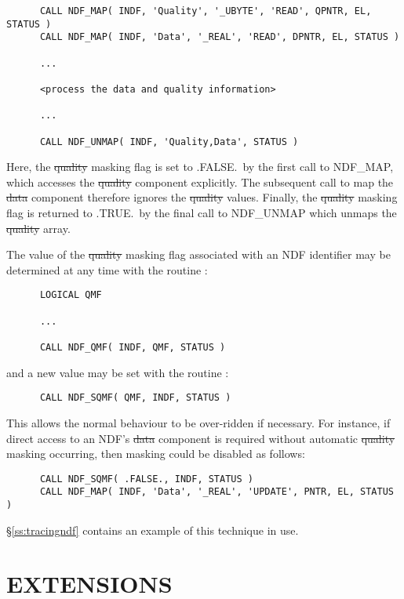 \small
\begin{verbatim}
      CALL NDF_MAP( INDF, 'Quality', '_UBYTE', 'READ', QPNTR, EL, STATUS )
      CALL NDF_MAP( INDF, 'Data', '_REAL', 'READ', DPNTR, EL, STATUS )

      ...

      <process the data and quality information>

      ...

      CALL NDF_UNMAP( INDF, 'Quality,Data', STATUS )
\end{verbatim}
\normalsize

Here, the \st{quality\/} masking flag is set to .FALSE.\ by the first call to
NDF\_MAP,  which accesses the \st{quality\/} component explicitly. 
The subsequent call to map the \st{data\/} component therefore ignores the
\st{quality\/} values.
Finally, the \st{quality\/} masking flag is returned to .TRUE.\ by the final call
to  NDF\_UNMAP which unmaps the \st{quality\/} array.

The value of the \st{quality\/} masking flag associated with an NDF identifier
may be determined at any time with the routine :

\small
\begin{verbatim}
      LOGICAL QMF

      ...

      CALL NDF_QMF( INDF, QMF, STATUS )
\end{verbatim}
\normalsize

and a new value may be set with the routine :

\small
\begin{verbatim}
      CALL NDF_SQMF( QMF, INDF, STATUS )
\end{verbatim}
\normalsize

This allows the normal behaviour to be over-ridden if necessary.
For instance, if direct access to an NDF's \st{data\/} component is required 
without automatic \st{quality\/} masking occurring, then masking could be
disabled as follows:

\small
\begin{verbatim}
      CALL NDF_SQMF( .FALSE., INDF, STATUS )
      CALL NDF_MAP( INDF, 'Data', '_REAL', 'UPDATE', PNTR, EL, STATUS )
\end{verbatim}
\normalsize

\S\ref{ss:tracingndf} contains an example of this technique in use.


\section{EXTENSIONS}

